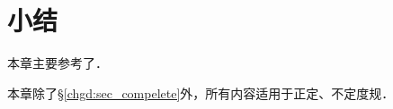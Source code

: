 \section*{小结}
本章主要参考了\parencite[Ch.3, Ch.5, Ch.6]{chen-li-2023-2ed-v1}．


本章除了\S\ref{chgd:sec_compelete}外，所有内容适用于正定、不定度规．



\printbibliography[heading=subbibliography,title=第\ref{chgd}章参考文献]

\endinput
























